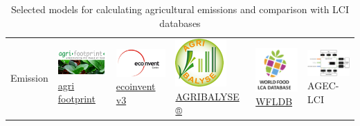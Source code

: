 \documentclass[openany]{book}
\begin{document}
\begin{longtable}[]{@{}llllll@{}}
\caption{\label{tab:agec-models} Selected models for calculating agricultural emissions and comparison with LCI databases}\tabularnewline
\toprule
\begin{minipage}[b]{0.12\columnwidth}\raggedright
Emission\strut
\end{minipage} & \begin{minipage}[b]{0.16\columnwidth}\raggedright
\includegraphics{Figures/agri-footprint.png} \href{https://www.agri-footprint.com/}{agri footprint} \citep{durlinger2017}\strut
\end{minipage} & \begin{minipage}[b]{0.12\columnwidth}\raggedright
\includegraphics{Figures/ecoinvent.png} \href{https://www.ecoinvent.org/}{ecoinvent v3} \citep{nemecek2011}\strut
\end{minipage} & \begin{minipage}[b]{0.13\columnwidth}\raggedright
\includegraphics{Figures/agribalyse.png} \href{https://www.ademe.fr/en/expertise/alternative-approaches-to-production/agribalyse-program}{AGRIBALYSE ®} \citep{Koch2015}\strut
\end{minipage} & \begin{minipage}[b]{0.12\columnwidth}\raggedright
\includegraphics{Figures/WFLDB.png} \href{https://quantis-intl.com/tools/databases/wfldb-food/}{WFLDB} \citep{nemecek2014}\strut
\end{minipage} & \begin{minipage}[b]{0.17\columnwidth}\raggedright
\includegraphics{Figures/agec_lci_logo.png} AGEC-LCI\strut

\end{minipage}
\end{longtable}
\end{document}
